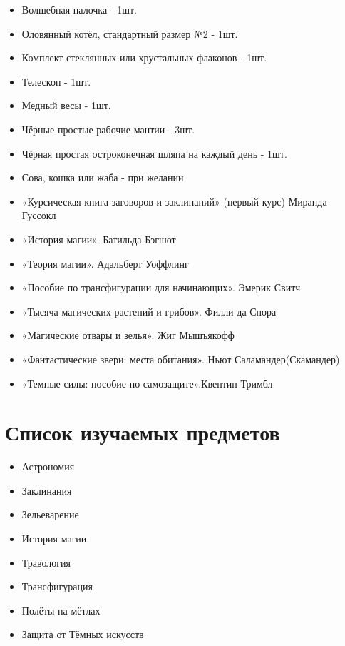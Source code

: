 \documentclass[14pt, a4paper]{article}
\begin{document}
\begin{itemize}
\item Волшебная палочка - 1шт.
\item Оловянный котёл, стандартный размер №2 - 1шт.
\item Комплект стеклянных или хрустальных флаконов - 1шт.
\item Телескоп - 1шт.
\item Медный весы - 1шт.
\item Чёрные простые рабочие мантии - 3шт.
\item Чёрная простая остроконечная шляпа на каждый день - 1шт.
\item Сова, кошка или жаба - при желании
\item «Курсическая книга заговоров и заклинаний» (первый курс) Миранда Гуссокл
\item «История магии». Батильда Бэгшот
\item «Теория магии». Адальберт Уоффлинг
\item «Пособие по трансфигурации для начинающих». Эмерик Свитч
\item «Тысяча магических растений и грибов». Филли-да Спора
\item «Магические отвары и зелья». Жиг Мышъякофф
\item «Фантастические звери: места обитания». Ньют Саламандер(Скамандер)
\item «Темные силы: пособие по самозащите».Квентин Тримбл
\end{itemize}

\newpage
\section{Список изучаемых предметов}

\begin{itemize}
\item Астрономия
\item Заклинания
\item Зельеварение
\item История магии
\item Травология
\item Трансфигурация
\item Полёты на мётлах
\item Защита от Тёмных искусств
\end{itemize}
\end{document}
